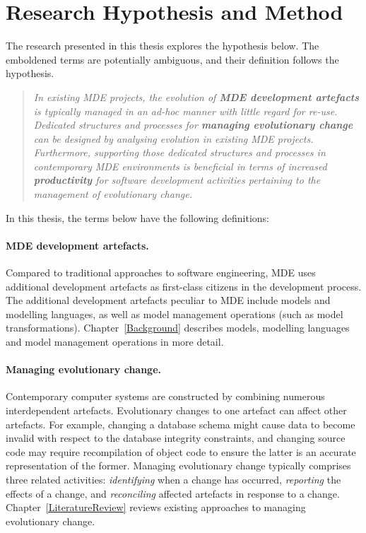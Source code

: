 
\section{Research Hypothesis and Method}
\label{sec:hypothesis}

The research presented in this thesis explores the hypothesis below. The emboldened terms are potentially ambiguous, and their definition follows the hypothesis.

\begin{quote}
\emph{In existing MDE projects, the evolution of \textbf{MDE development artefacts} is typically managed in an ad-hoc manner with little regard for re-use. Dedicated structures and processes for \textbf{managing evolutionary change} can be designed by analysing evolution in existing MDE projects. Furthermore, supporting those dedicated structures and processes in contemporary MDE environments is beneficial in terms of increased \textbf{productivity} for software development activities pertaining to the management of evolutionary change.}
\end{quote}

In this thesis, the terms below have the following definitions:

\paragraph{MDE development artefacts.} Compared to traditional approaches to software engineering, MDE uses additional development artefacts as first-class citizens in the development process. The additional development artefacts peculiar to MDE include models and modelling languages, as well as model management operations (such as model transformations). Chapter~\ref{Background} describes models, modelling languages and model management operations in more detail.

\paragraph{Managing evolutionary change.} Contemporary computer systems are constructed by combining numerous interdependent artefacts. Evolutionary changes to one artefact can affect other artefacts. For example, changing a database schema might cause data to become invalid with respect to the database integrity constraints, and changing source code may require recompilation of object code to ensure the latter is an accurate representation of the former. Managing evolutionary change typically comprises three related activities: \emph{identifying} when a change has occurred, \emph{reporting} the effects of a change, and \emph{reconciling} affected artefacts in response to a change. Chapter~\ref{LiteratureReview} reviews existing approaches to managing evolutionary change.

